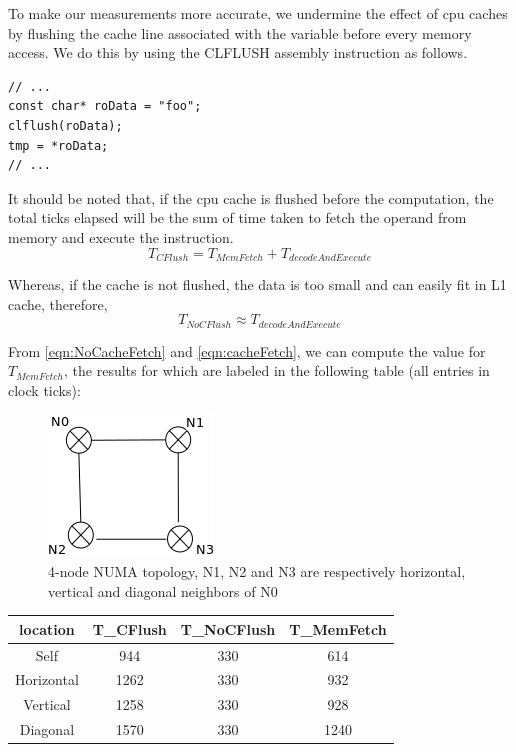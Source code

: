To make our measurements more accurate, we undermine the effect of cpu caches by flushing the cache line associated with the 
variable before every memory access. We do this by using the CLFLUSH\cite{clflush} assembly instruction as follows.


\begin{verbatim}
// ...
const char* roData = "foo";
clflush(roData);
tmp = *roData;
// ...
\end{verbatim}

It should be noted that, if the cpu cache is flushed before the computation, the total ticks elapsed will be the sum of time 
taken to fetch the operand from memory and execute the instruction.
\begin{dmath}
\label{eqn:NoCacheFetch}
T_{CFlush} = T_{MemFetch} + T_{decodeAndExecute}
\end{dmath}

Whereas, if the cache is not flushed, the data is too small and can easily fit in L1 cache, therefore, 
\begin{dmath}
\label{eqn:cacheFetch}
T_{NoCFlush} \approx T_{decodeAndExecute}
\end{dmath}

From \ref{eqn:NoCacheFetch} and \ref{eqn:cacheFetch}, we can compute the value for $T_{MemFetch}$, the
results for which are labeled in the following table (all entries in clock ticks):

\begin{figure}
    \centering
    \includegraphics[scale=0.38]{hypercube.png}
    \caption{4-node NUMA topology, N1, N2 and N3 are respectively horizontal, vertical and diagonal neighbors of N0}
    \label{fig:remoteVsLocal}
\end{figure}


\begin{center}
\begin{tabular}{c|c|c|c}
\hline
location & T_{CFlush} & T_{NoCFlush} & T_{MemFetch}\\
\hline
Self & 944 & 330 & 614\\
Horizontal & 1262 & 330 & 932 \\
Vertical & 1258 & 330 & 928\\
Diagonal & 1570 & 330 & 1240\\
\hline
\end{tabular}
\end{center}

